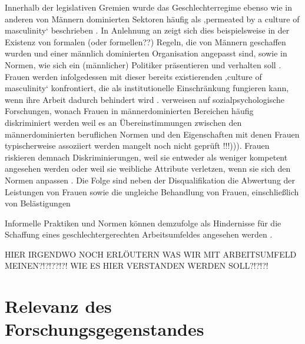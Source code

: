 \documentclass[12pt, 
    twoside=false, 
    bibliography=totoc, 
    numbers=endperiod, 
    headings=normal, 
    toc=chapterentrydotfill
    ]{scrbook}
\begin{document}
Innerhalb der legislativen Gremien wurde das Geschlechterregime ebenso wie in anderen von Männern dominierten Sektoren häufig als ‚permeated by a culture of masculinity‘ beschrieben \parencites[200]{erikson_2018}{lovenduski_2005}. In Anlehnung an \textcite{acker_1990} zeigt sich dies beispielsweise in der Existenz von formalen (oder formellen??) Regeln, die von Männern geschaffen wurden und einer männlich dominierten Organisation angepasst sind, sowie in Normen, wie sich ein (männlicher) Politiker präsentieren und verhalten soll \parencites[200]{erikson_2018}[48]{acker_1990}. Frauen werden infolgedessen mit dieser bereits existierenden ‚culture of masculinity‘ konfrontiert, die als institutionelle Einschränkung fungieren kann, wenn ihre Arbeit dadurch behindert wird \parencites[200]{erikson_2018}[47-56]{lovenduski_2005}. \textcite{erikson_2018} verweisen auf sozialpsychologische Forschungen, wonach Frauen in männerdominierten Bereichen häufig diskriminiert werden weil es an Übereinstimmungen zwischen den männerdominierten beruflichen Normen und den Eigenschaften mit denen Frauen typischerweise assoziiert werden mangelt \parencites[vgl.][]{burgess_1999}{eagly_2002}{heilman_2001}{heilman_2004} noch nicht geprüft !!!))). Frauen riskieren demnach Diskriminierungen, weil sie entweder als weniger kompetent angesehen werden oder weil sie weibliche Attribute verletzen, wenn sie sich den Normen anpassen \parencite[200]{erikson_2018}. Die Folge sind neben der Disqualifikation die Abwertung der Leistungen von Frauen sowie die ungleiche Behandlung von Frauen, einschließlich von Belästigungen \parencites[200]{erikson_2018}{heilman_2001}{burgess_1999}

\begin{quote}
     \parencite[200]{erikson_2018}
\end{quote}

Informelle Praktiken und Normen können demzufolge als Hindernisse für die Schaffung eines geschlechtergerechten Arbeitsumfeldes angesehen werden \parencite[200]{erikson_2018}. 

HIER IRGENDWO NOCH ERLÖUTERN WAS WIR MIT ARBEITSUMFELD MEINEN?!?!??!?! WIE ES HIER VERSTANDEN WERDEN SOLL?!?!?!



\chapter{Relevanz des Forschungsgegenstandes}
\end{document}
